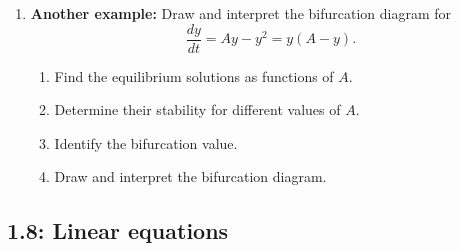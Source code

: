 \documentclass{article}
\begin{document}
\begin{enumerate}
\begin{enumerate}
\item \textbf{Interpretation:} $h=4$ is the maximum sustainable harvesting
rate. For $h<4$, there is a positive equilibrium population. At $h=4$, the
positive equilibria merge. For $h>4$, no positive equilibrium exists, so the
population eventually declines.

\item Draw the \emph{bifurcation diagram}: plot equilibrium values $P^*$ on
the vertical axis against the parameter $h$ on the horizontal axis. Indicate
which equilibrium branches are stable and unstable.
\end{enumerate}

\item \textbf{Another example:} Draw and interpret the bifurcation diagram for
\[
\frac{dy}{dt}=Ay-y^2=y(A-y).
\]

\begin{enumerate}
\item Find the equilibrium solutions as functions of $A$.
\item Determine their stability for different values of $A$.
\item Identify the bifurcation value.
\item Draw and interpret the bifurcation diagram.
\end{enumerate}

\end{enumerate}


\subsection{1.8: Linear equations}
\end{document}
